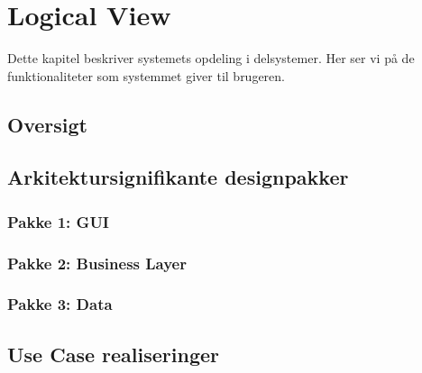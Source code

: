 \section{Logical View}
Dette kapitel beskriver systemets opdeling i delsystemer. Her ser vi på de funktionaliteter som systemmet giver til brugeren. 

\subsection{Oversigt}


\subsection{Arkitektursignifikante designpakker	}
\subsubsection{Pakke 1: GUI}


\subsubsection{Pakke 2: Business Layer}


\subsubsection{Pakke 3: Data}


\subsection{Use Case realiseringer}

